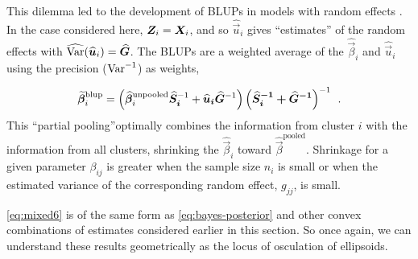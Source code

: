This dilemma led to the development of BLUPs in models with random effects \citep{Henderson:1975,Robinson:1991,Speed:1991}.
In the case considered here, $\bm{Z}_i = \bm{X}_i$, and so $\widehat{\vec{u}}_i$ gives ``estimates'' of the random effects with
$\widehat{\mathrm{Var}} (\widehat{\bm{u}}_i) = \widehat{\bm{G}}$. The BLUPs are a weighted average of the $\widehat{\vec{\beta}}_i$
and $\widehat{\vec{u}}_i$ using the precision ($\mathrm{Var}^{-1}$) as weights,

\begin{equation}\label{eq:mixed6}
 \widetilde{\bm{\beta}}^{\textrm{blup}}_i =
 \left(
   \widehat{\bm{\beta}}^{\textrm{unpooled}}_i \bm{\widehat{\bm{S}}_i}^{-1}  + \bm{\widehat{\bm{u}}_i \widehat{\bm{G}}}^{-1}
 \right)
 \bm{ \left( \bm{\widehat{\bm{S}}_i}^{-1} + \bm{\widehat{\bm{G}}}^{-1} \right) }^{-1} \:\: .
\end{equation}
This ``partial pooling''optimally combines the information from cluster $i$ with the information from all clusters,
shrinking the $\widehat{\vec{\beta}}_i$ toward $\widehat{\vec{\beta}}^{\textrm{pooled}}$. Shrinkage
for a given parameter $\beta_{ij}$ is greater
when the sample size $n_i$ is small or when the estimated variance of the corresponding 
random effect, $g_{jj}$, is small.

\eqref{eq:mixed6}
is of the same form as \eqref{eq:bayes-posterior} and other convex combinations of estimates considered
earlier in this section. So once again, we can understand these results geometrically as the locus of
osculation of ellipsoids.


